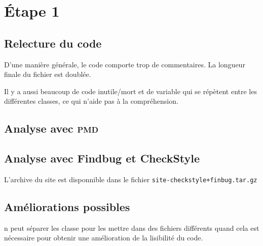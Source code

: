 \section{\'Etape 1}
    \subsection{Relecture du code}
        D'une manière générale, le code comporte trop de commentaires. La longueur finale du fichier est doublée.
        
        Il y a aussi beaucoup de code inutile/mort et de variable qui se répètent entre les différentes classes, ce qui n'aide pas à la compréhension.
        
    \subsection{Analyse avec \textsc{pmd}}
    
    \subsection{Analyse avec Findbug et CheckStyle}
        L'archive du site est disponnible dans le fichier \og \verb#site-checkstyle+finbug.tar.gz# \fg
    
    \subsection{Améliorations possibles}
        n peut séparer les classe pour les mettre dans des fichiers différents quand cela est nécessaire pour obtenir une amélioration de la lisibilité du code.